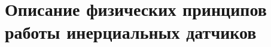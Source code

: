 \chapter{Описание физических принципов работы инерциальных датчиков}
\label{chap:theory}


\newpage




%
\newpage





